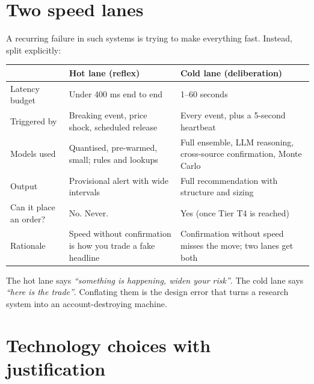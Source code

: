 \section{Two speed lanes}

A recurring failure in such systems is trying to make everything fast. Instead,
split explicitly:

\begin{longtable}{@{}p{3.2cm}p{5.4cm}p{5.8cm}@{}}
\toprule
& \textbf{Hot lane (reflex)} & \textbf{Cold lane (deliberation)}\\
\midrule
Latency budget & Under 400 ms end to end & 1--60 seconds\\
Triggered by & Breaking event, price shock, scheduled release & Every event,
plus a 5-second heartbeat\\
Models used & Quantised, pre-warmed, small; rules and lookups & Full ensemble,
LLM reasoning, cross-source confirmation, Monte Carlo\\
Output & Provisional alert with wide intervals & Full recommendation with
structure and sizing\\
Can it place an order? & No. Never. & Yes (once Tier T4 is reached)\\
Rationale & Speed without confirmation is how you trade a fake headline &
Confirmation without speed misses the move; two lanes get both\\
\bottomrule
\end{longtable}

\begin{keybox}[title={The two-lane rule}]
The hot lane says \emph{``something is happening, widen your risk''}.
The cold lane says \emph{``here is the trade''}. Conflating them is the design
error that turns a research system into an account-destroying machine.
\end{keybox}

\section{Technology choices with justification}

